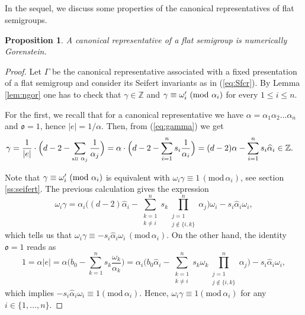 \documentclass[oneside]{amsart}
\numberwithin{equation}{section}
\numberwithin{equation}{subsection}
\theoremstyle{plain}
\newtheorem{proposition}[equation]{Proposition}
\theoremstyle{definition}
\newcommand{\w}{\omega}
\newcommand{\al}{\alpha}
\newcommand{\G}{\Gamma}
\newcommand{\oo}{\mathfrak{o}}
\begin{document}
\subsection{} In the sequel, we discuss some  properties of 
the canonical representatives of flat semigroups. 
 \begin{proposition}\label{lm_flat_ngor}    
    A canonical representative of a flat
    semigroup is numerically Gorenstein.
 \end{proposition}
 \begin{proof}
    Let $\G$ be the canonical representative associated with a fixed presentation of 
    a flat semigroup and consider its Seifert invariants as in (\ref{eq:Sfcr}).  By Lemma \ref{lem:ngor} one has to check 
    that $\gamma\in \mathbb{Z}$ and $\gamma\equiv\omega_i'\ ({\rm mod}\ \alpha_i)$  for every $1\le i\le n$. 
    
  For the first, we recall that for a canonical representative we have $\al=\al_1\al_2\dots\alpha_n$ and $\oo=1$, hence $|e|=1/\al$. Then, from (\ref{eq:gamma}) we get 
     \begin{align*}
         \gamma&=\frac{1}{|e|}\cdot
         \Big(d-2-\sum_{\mbox{\tiny all} \ \al_j} \frac{1}{\al_j}\Big)
         =\al\cdot  
         \Big(d -2-\sum_{i=1}^{n}s_i \frac{1}{\al_i}\Big)=(d-2)\al-\sum_{i=1}^{n}s_i \widehat{\al}_i\in\mathbb{Z}.            
     \end{align*}
   
     Note that $\gamma\equiv\omega_i'\ ({\rm mod}\ \alpha_i)$ is equivalent with $ \w_i \gamma\equiv 1\,(\mathrm{mod }\,\al_i)$, see section \ref{ss:seifert}. The previous calculation gives the expression  
     \[
     \w_i \gamma= \al_i
 \Big((d-2)\widehat{\al}_i-\sum_{\substack{k=1\\k\neq i}}^n s_k\prod_{\substack{j=1\\j\notin \{i,k\}}}^n\al_j \Big)\w_i
 -s_i\widehat{\al}_i \w_i,   
     \]
     which tells us that  $\w_i \gamma \equiv -s_i\widehat{\al}_i\w_i\, (\mathrm{mod }\,{\al_i})$.
    On the other hand, the identity  $\oo=1$ reads as
    \[
    1=\al|e|= \al\Big(b_0-\sum_{k=1}^n s_k \frac{\w_k}{\al_k}\Big)= \al_i
    \Big(b_0\widehat{\al}_i-\sum_{\substack{k=1\\k\neq i}}^n s_k\w_k\prod_{\substack{j=1\\j\notin \{i,k\}}}^n\al_j \Big)
    -s_i\widehat{\al}_i\w_i,  
    \]
    which implies 
   $-s_i\widehat{\al}_i\w_i\equiv 1(\mathrm{mod }\,{\al_i})$. 
   Hence, $\w_i\gamma\equiv 1(\mathrm{mod }\,{\al_i})$ for any $i\in\{1,\dots,n\}$.
 \end{proof}
\end{document}
